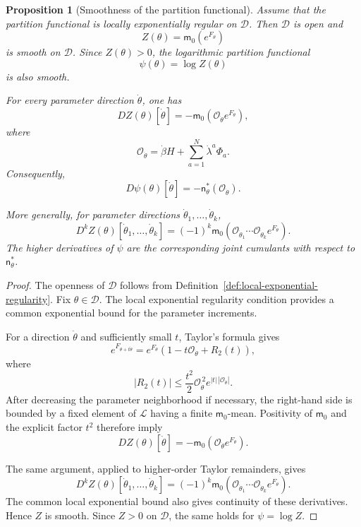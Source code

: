 \documentclass[11pt,reqno]{amsart}
\newtheorem{Proposition}[Theorem]{Proposition}
\begin{document}
\begin{Proposition}[Smoothness of the partition functional]
\label{prop:partition-smoothness}
Assume that the partition functional is locally exponentially regular
on $\mathcal D$. Then $\mathcal D$ is open and
\[
Z(\theta)=\mathsf m_0(e^{F_\theta})
\]
is smooth on $\mathcal D$. Since $Z(\theta)>0$, the logarithmic
partition functional
\[
\psi(\theta)=\log Z(\theta)
\]
is also smooth.

For every parameter direction $\dot\theta$, one has
\[
DZ(\theta)[\dot\theta]
=
-\mathsf m_0\left(
\mathcal O_{\dot\theta}e^{F_\theta}
\right),
\]
where
\[
\mathcal O_{\dot\theta}
=
\dot\beta H+\sum_{a=1}^{N}\dot\lambda^a\Phi_a.
\]
Consequently,
\[
D\psi(\theta)[\dot\theta]
=
-\mathsf n_\theta^*(\mathcal O_{\dot\theta}).
\]

More generally, for parameter directions
$\dot\theta_1,\ldots,\dot\theta_k$,
\[
D^kZ(\theta)
[\dot\theta_1,\ldots,\dot\theta_k]
=
(-1)^k
\mathsf m_0\left(
\mathcal O_{\dot\theta_1}\cdots
\mathcal O_{\dot\theta_k}
e^{F_\theta}
\right).
\]
The higher derivatives of $\psi$ are the corresponding joint cumulants
with respect to $\mathsf n_\theta^*$.
\end{Proposition}

\begin{proof}
The openness of $\mathcal D$ follows from
Definition~\ref{def:local-exponential-regularity}. Fix
$\theta\in\mathcal D$. The local exponential regularity condition
provides a common exponential bound for the parameter increments.

For a direction $\dot\theta$ and sufficiently small $t$, Taylor's
formula gives
\[
e^{F_{\theta+t\dot\theta}}
=
e^{F_\theta}
\left(
1-t\mathcal O_{\dot\theta}
+
R_2(t)
\right),
\]
where
\[
|R_2(t)|
\leq
\frac{t^2}{2}
\mathcal O_{\dot\theta}^{\,2}
e^{|t|\,|\mathcal O_{\dot\theta}|}.
\]
After decreasing the parameter neighborhood if necessary, the
right-hand side is bounded by a fixed element of $\mathcal L$ having a
finite $\mathsf m_0$-mean. Positivity of $\mathsf m_0$ and the explicit
factor $t^2$ therefore imply
\[
DZ(\theta)[\dot\theta]
=
-\mathsf m_0\left(
\mathcal O_{\dot\theta}e^{F_\theta}
\right).
\]

The same argument, applied to higher-order Taylor remainders, gives
\[
D^kZ(\theta)
[\dot\theta_1,\ldots,\dot\theta_k]
=
(-1)^k
\mathsf m_0\left(
\mathcal O_{\dot\theta_1}\cdots
\mathcal O_{\dot\theta_k}
e^{F_\theta}
\right).
\]
The common local exponential bound also gives continuity of these
derivatives. Hence $Z$ is smooth. Since $Z>0$ on $\mathcal D$, the same
holds for $\psi=\log Z$.
\end{proof}
\end{document}
